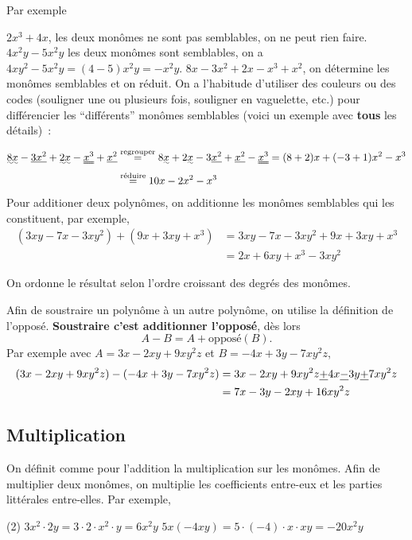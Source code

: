 \documentclass[a4paper,12pt]{report}
\begin{document}
Par exemple
\begin{tasks}
	\task $2x^3+4x$, les deux monômes ne sont pas semblables, on ne peut rien faire.
	\task $4x^2y-5x^2y$ les deux monômes sont semblables, on a $4xy^2-5x^2y=(4-5)x^2y=-x^2y$. 
	\task $8x-3x^2+2x-x^3+x^2$, on détermine les monômes semblables et on réduit. On a l'habitude d'utiliser des couleurs ou des codes (souligner une ou plusieurs fois, souligner en vaguelette, etc.) pour différencier les \enquote{différents} monômes semblables (voici un exemple avec {\bfseries tous} les détails)~: 
\end{tasks}
\begin{align*}
	\uwave{8x}-\uline{3x^2}+\uwave{2x}-\uuline{x^3}+\uline{x^2}&\stackrel{\text{regrouper}}{=}8\uwave{x}+2\uwave{x}-3\uline{x^2}+\uline{x^2}-\uuline{x^3}=(8+2)x+(-3+1)x^2-x^3\\
&\stackrel{\text{réduire}}{=}10x-2x^2-x^3
\end{align*}
Pour additioner deux polynômes, on additionne les monômes semblables qui les constituent, par exemple,
\begin{align*}
	(3xy-7x-3xy^2)+(9x+3xy+x^3)&=3xy-7x-3xy^2+9x+3xy+x^3\\
				   &=2x+6xy+x^3-3xy^2
\end{align*}
\begin{rem}
	On ordonne le résultat selon l'ordre croissant des degrés des monômes.
\end{rem}
Afin de soustraire un polynôme à un autre polynôme, on utilise la définition de l'opposé. {\bfseries Soustraire c'est additionner l'opposé}, dès lors
\[A-B=A+\text{opposé}(B).\]
Par exemple avec $A=3x-2xy+9xy^2z$ et $B=-4x+3y-7xy^2z$, 
\begin{align*}
	(3x-2xy+9xy^2z)-(-4x+3y-7xy^2z)&=3x-2xy+9xy^2z\uline{+}4x\uline{-}3y\uline{+}7xy^2z\\
&=7x-3y-2xy+16xy^2z
\end{align*}
\subsection{Multiplication}
On définit comme pour l'addition la multiplication sur les monômes. Afin de multiplier deux monômes, on multiplie les coefficients entre-eux et les parties littérales entre-elles. 
Par exemple, 
\begin{tasks}(2)
	\task $3x^2\cdot 2y=3\cdot 2\cdot x^2\cdot y=6x^2y$
	\task $5x(-4xy)=5\cdot (-4)\cdot x\cdot xy=-20x^2y$
\end{tasks}
\end{document}
